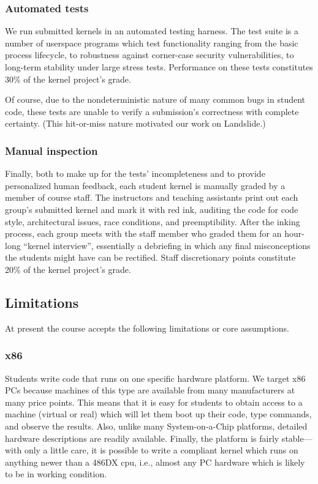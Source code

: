 \subsubsection{Automated tests}
We run submitted kernels in an automated testing harness. The test suite is a number of userspace programs which test functionality ranging from the basic process lifecycle, to robustness against corner-case security vulnerabilities, to long-term stability under large stress tests.
Performance on these tests constitutes 30\% of the kernel project's grade.

Of course, due to the nondeterministic nature of many common bugs in student code, these tests are unable to verify a submission's correctness with complete certainty.
(This hit-or-miss nature motivated our work on Landslide.)

\subsubsection{Manual inspection}
Finally, both to make up for the tests' incompleteness and to provide personalized human feedback, each student kernel is manually graded by a member of course staff.
The instructors and teaching assistants print out each group's submitted kernel and mark it with red ink, auditing the code for code style, architectural issues, race conditions, and preemptibility.
After the inking process, each group meets with the staff member who graded them for an hour-long ``kernel interview'', essentially a debriefing in which any final misconceptions the students might have can be rectified.
Staff discretionary points constitute 20\% of the kernel project's grade.

\subsection{Limitations}

At present the course accepts the following limitations
or core assumptions.

\subsubsection{x86}

Students write code that runs on one specific
hardware platform.
We target x86 PCs because machines of this type are
available from many manufacturers at many price points.
This means that it is easy for students to obtain access
to a machine (virtual or real) which will let them boot
up their code, type commands, and observe the results.
Also, unlike many System-on-a-Chip platforms,
detailed hardware descriptions are readily available.
Finally, the platform is fairly stable---with only a
little care, it is possible to write a compliant
kernel which runs on anything newer than a 486DX cpu,
i.e., almost any PC hardware which is likely to be in
working condition.

